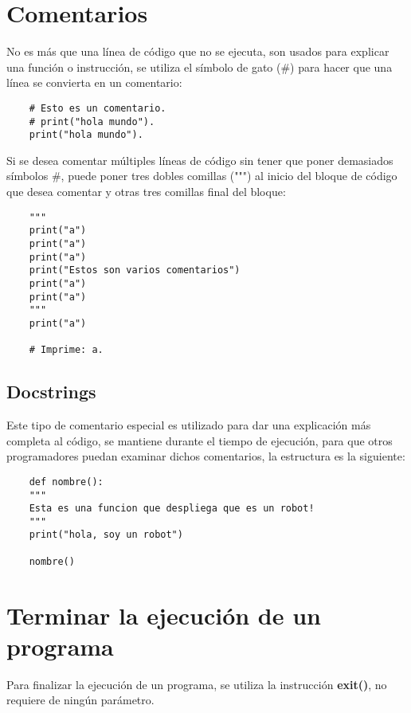\section{Comentarios}

No es más que una línea de código que no se ejecuta, son usados para explicar una función o instrucción, se utiliza el símbolo de gato (\#) para hacer que una línea se convierta en un comentario:
\begin{lstlisting}
    # Esto es un comentario.
    # print("hola mundo").
    print("hola mundo").
\end{lstlisting}

Si se desea comentar múltiples líneas de código sin tener que poner demasiados símbolos \#, puede poner tres dobles comillas (""") al inicio del bloque de código que desea comentar y otras tres comillas final del bloque:
\begin{lstlisting}
    """
    print("a")
    print("a")
    print("a")
    print("Estos son varios comentarios")
    print("a")
    print("a")
    """
    print("a")

    # Imprime: a.
\end{lstlisting}


\subsection{Docstrings}

Este tipo de comentario especial es utilizado para dar una explicación más completa al código, se mantiene durante el tiempo de ejecución, para que otros programadores puedan examinar dichos comentarios, la estructura es la siguiente:
\begin{lstlisting}
    def nombre():
    """
    Esta es una funcion que despliega que es un robot!
    """
    print("hola, soy un robot")
		
    nombre()
\end{lstlisting}



\section{Terminar la ejecución de un programa}

Para finalizar la ejecución de un programa, se utiliza la instrucción \textbf{exit()}, no requiere de ningún parámetro.
